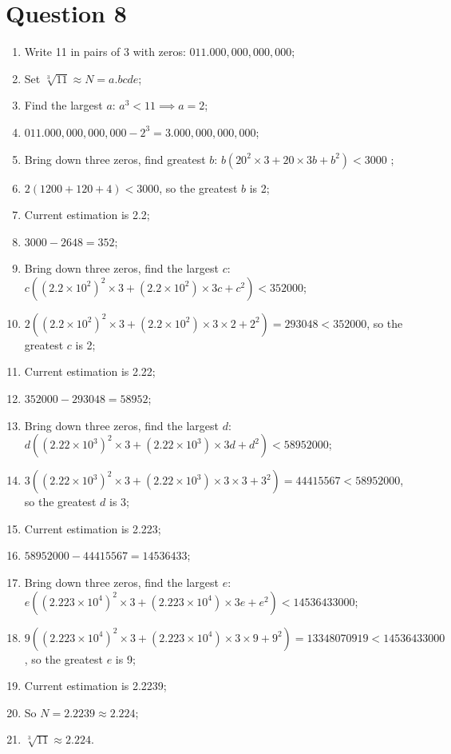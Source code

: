 \documentclass{article}
\begin{document}
\newpage

\section*{Question 8}

\begin{enumerate}
    \item Write 11 in pairs of 3 with zeros: $011.000,000,000,000$;
    \item Set $\sqrt[3]{11}\approx N=a.bcde$;
    \item Find the largest $a$: $a^3<11\implies a=2$;
    \item $011.000,000,000,000-2^3=3.000,000,000,000$;
    \item Bring down three zeros, find greatest $b$: $b(20^2\times3+20\times 3b+b^2)<3000$ ;
    \item $2(1200+120+4)<3000$, so the greatest $b$ is 2;
    \item Current estimation is 2.2;
    \item $3000-2648=352$;
    \item Bring down three zeros, find the largest $c$: $c((2.2\times 10^2)^2\times 3+(2.2\times 10^2)\times 3c+c^2)<352000$;
    \item $2((2.2\times 10^2)^2\times 3+(2.2\times 10^2)\times 3\times 2+2^2)=293048<352000$, so the greatest $c$ is 2;
    \item Current estimation is 2.22;
    \item $352000-293048=58952$;
    \item Bring down three zeros, find the largest $d$: $d((2.22\times 10^3)^2\times 3+(2.22\times 10^3)\times 3d+d^2)<58952000$;
    \item $3((2.22\times 10^3)^2\times 3+(2.22\times 10^3)\times 3\times 3+3^2)=44415567<58952000$, so the greatest $d$ is 3;
    \item Current estimation is 2.223;
    \item $58952000-44415567=14536433$;
    \item Bring down three zeros, find the largest $e$: $e((2.223\times 10^4)^2\times 3+(2.223\times 10^4)\times 3e+e^2)<14536433000$;
    \item $9((2.223\times 10^4)^2\times 3+(2.223\times 10^4)\times 3\times 9+9^2)=13348070919<14536433000$, so the greatest $e$ is 9;
    \item Current estimation is 2.2239;
    \item So $N=2.2239\approx 2.224$;
    \item $\sqrt[3]{11}\approx2.224$.
\end{enumerate}
\end{document}
